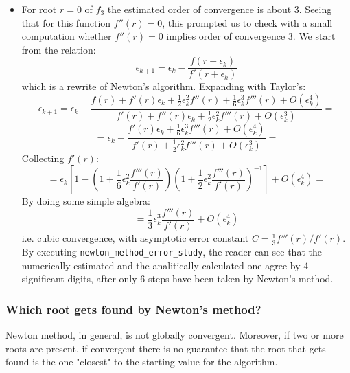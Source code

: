 \documentclass[a4paper,11]{article}
\newcommand{\mdcode}[1]{\lstinline[backgroundcolor=\color{gray!10}, frame=single, frameround=tttt]|#1|}
\begin{document}
\begin{itemize}
{		This is the same order of convergence and asymptotic error constant of
		bisection method. However, in bisection method only a single 
		function evaluation is required at each step, while in 
		Newton method both the function and its derivative must be evaluated.
		Thus, in the case $f'(r) = 0$, for 
		the same precision gained at each step, 
		Newton method is twice as expensive,
		compared to bisection method, if we assume the evaluation of the 
		derivative to be comparable to evaluation of the function in 
		computational cost.
	}
	\item{
		For root $r=0$ of $f_{3}$ the estimated order of convergence is about 3.
		Seeing that for this function $f''(r)=0$, this prompted us to check
		with a small computation whether $f''(r)=0$ implies order of 
		convergence 3. We start from the relation:
		\[
			\epsilon_{k+1} = \epsilon_{k} - \frac{f(r + \epsilon_{k})}{f'(r + \epsilon_{k})}
		\]
		which is a rewrite of Newton's algorithm.
		Expanding with Taylor's:
		\[
			\epsilon_{k+1} = \epsilon_{k} - 	
			\frac{f(r) + f'(r)\epsilon_{k} + 
			\frac{1}{2}\epsilon_{k}^{2}f''(r) + \frac{1}{6}\epsilon_{k}^{3}f'''(r) +
			O(\epsilon_{k}^{4})}{f'(r) + f''(r)\epsilon_{k} + 
			\frac{1}{2}\epsilon_{k}^{2}f'''(r) + O(\epsilon_{k}^{3})} = 
		\]
		\[
			= \epsilon_{k} - 	
			\frac{f'(r)\epsilon_{k} +  \frac{1}{6}\epsilon_{k}^{3}f'''(r) +
			O(\epsilon_{k}^{4})}
			{f'(r) + \frac{1}{2}\epsilon_{k}^{2}f'''(r) + O(\epsilon_{k}^{3})} =
		\]
		Collecting $f'(r)$:
		\[
			= \epsilon_{k} \left[ 1 - \left( 1 + \frac{1}{6} \epsilon_{k}^{2}
			\frac{f'''(r)}{f'(r)}\right)\left( 1 + \frac{1}{2}\epsilon_{k}^{2}
			\frac{f'''(r)}{f'(r)}\right)^{-1}\right] +O(\epsilon_{k}^{4})=
		\]
		By doing some simple algebra:
		\[
			=\frac{1}{3}\epsilon_{k}^{3}\frac{f'''(r)}{f'(r)}+O(\epsilon_{k}^{4})
		\]
		i.e. cubic convergence, with asymptotic error constant 
		$C = \frac{1}{3}f'''(r)/f'(r)$.
		By executing \mdcode{newton_method_error_study}, the reader can see that 
		the numerically estimated and the analitically calculated one agree by
		4 significant digits, after only 6 steps have been taken by Newton's 
		method.
	}
\end{itemize}



\subsubsection{Which root gets found by Newton's method?}

Newton method, in general, is not globally convergent. Moreover, if two or more 
roots are present, if convergent there is no guarantee that the root that gets
found is the one "closest" to the starting value for the algorithm.
\end{document}
